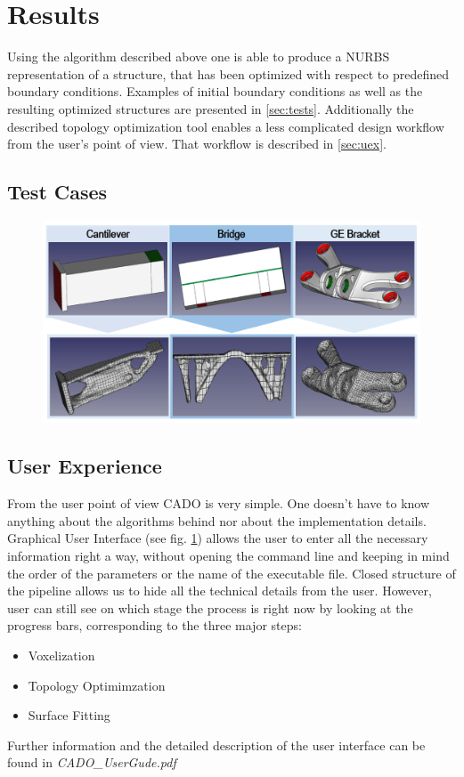 \chapter{Results}
Using the algorithm described above one is able to produce a NURBS representation of a structure, that has been optimized with respect to predefined boundary conditions. Examples of initial boundary conditions as well as the resulting optimized structures are presented in \autoref{sec:tests}. Additionally the described topology optimization tool enables a less complicated design workflow from the user's point of view. That workflow is described in \autoref{sec:uex}.
\section{Test Cases}
\label{sec:tests}
\begin{figure}[H]
\begin{center}
\includegraphics[width = \textwidth]{Pictures/TestCases.png}
\end{center}
\end{figure}

\section{User Experience}
\label{sec:uex}
From the user point of view CADO  is very simple. One doesn't have to know anything about the algorithms behind nor about the implementation details. Graphical User Interface (see fig. \ref{}) allows the user to enter all the necessary information right a way, without opening the command line and keeping in mind the order of the parameters or the name of the executable file. Closed structure of the pipeline allows us to hide all the technical details from the user. However, user can still see on which stage the process is right now by looking at the progress bars, corresponding to the three major steps:
\begin{itemize}
\item Voxelization
\item Topology Optimimzation
\item Surface Fitting
\end{itemize}

Further information and the detailed description of the user interface can be found in \textit{CADO\_UserGude.pdf}

